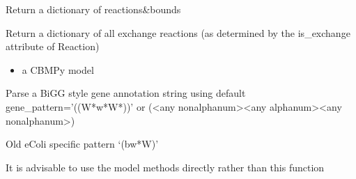 \documentclass[letterpaper,10pt,english]{sphinxmanual}
\begin{document}

\begin{fulllineitems}
\label{\detokenize{modules_doc:cbmpy.CBTools.getBoundsDict}}
\pysigstartsignatures
{}
\pysigstopsignatures
\sphinxAtStartPar
Return a dictionary of reactions\&bounds

\end{fulllineitems}


\begin{fulllineitems}
\label{\detokenize{modules_doc:cbmpy.CBTools.getExchBoundsDict}}
\pysigstartsignatures
{}
\pysigstopsignatures
\sphinxAtStartPar
Return a dictionary of all exchange reactions (as determined by the is\_exchange attribute of Reaction)
\begin{itemize}
\item {} 
\sphinxAtStartPar
{} a CBMPy model

\end{itemize}

\end{fulllineitems}


\begin{fulllineitems}
\label{\detokenize{modules_doc:cbmpy.CBTools.getModelGenesPerReaction}}
\pysigstartsignatures
{}
\pysigstopsignatures
\sphinxAtStartPar
Parse a BiGG style gene annotation string using default gene\_pattern=’((W*w*W*))’ or
(\textless{}any non\sphinxhyphen{}alphanum\textgreater{}\textless{}any alphanum\textgreater{}\textless{}any non\sphinxhyphen{}alphanum\textgreater{})

\sphinxAtStartPar
Old eColi specific pattern ‘(bw*W)’

\sphinxAtStartPar
It is advisable to use the model methods directly rather than this function

\end{fulllineitems}
\end{document}

